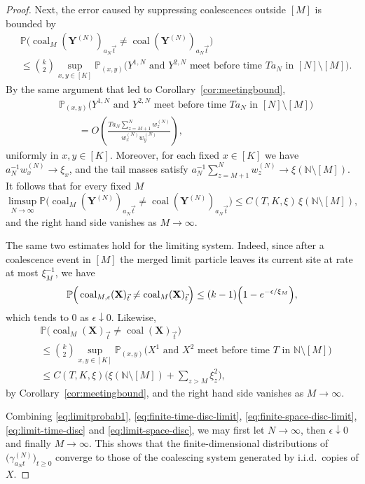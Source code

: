 \documentclass[10pt,a4paper]{amsart}
\newcommand{\bN}{\ensuremath{\mathbb{N}}}
\newcommand{\bP}{\ensuremath{\mathbb{P}}}
\begin{document}
\begin{proof}
	Next, the error caused by suppressing coalescences outside $[M]$ is bounded by
	\begin{align}
		& \bP\big( \operatorname{coal}_{M} (\mathbf{Y}^{(N)})_{a_N\vec{t}}\neq \operatorname{coal}(\mathbf{Y}^{(N)})_{a_N\vec{t}} \big)\nonumber\\
		&\leq \binom{k}{2} \sup_{x,y\in [K]} \bP_{(x,y)}\Big( Y^{1,N}\text{ and } Y^{2,N} \text{ meet before time }Ta_N \text{ in }[N]\setminus[M]\Big). \label{eq:finite-space-disc}
	\end{align}
	By the same argument that led to Corollary~\ref{cor:meetingbound},
	\[
	\begin{aligned}
	&\bP_{(x,y)}\Big( Y^{1,N}\text{ and } Y^{2,N} \text{ meet before time }Ta_N \text{ in }[N]\setminus[M]\Big)\\
	&\qquad =O\left(\frac{T a_N \sum_{z=M+1}^N w^{(N)}_z}{w^{(N)}_x w^{(N)}_y} \right),
	\end{aligned}
	\]
	uniformly in $x,y\in[K]$. Moreover, for each fixed $x\in[K]$ we have
	$a_N^{-1}w_x^{(N)}\to\xi_x$, and the tail masses satisfy
	$a_N^{-1}\sum_{z=M+1}^N w^{(N)}_z\to \xi(\bN\setminus[M])$.
	It follows that for every fixed $M$
	\begin{equation}\label{eq:finite-space-disc-limit}
		\limsup_{N\to\infty}\bP\big( \operatorname{coal}_{M} (\mathbf{Y}^{(N)})_{a_N\vec{t}}\neq \operatorname{coal}(\mathbf{Y}^{(N)})_{a_N\vec{t}} \big)
		\leq C(T,K,\xi)\,\xi(\bN\setminus[M]),
	\end{equation}
	and the right hand side vanishes as $M\to\infty$.

	The same two estimates hold for the limiting system. Indeed, since after a coalescence event in $[M]$ the merged limit particle leaves its current site at rate at most $\xi_M^{-1}$, we have
	\begin{equation}\label{eq:limit-time-disc}
		\bP\Big( \operatorname{coal}_{M,\epsilon}(\mathbf{X})_{\vec{t}}\neq \operatorname{coal}_{M}(\mathbf{X})_{\vec{t}} \Big)
		\leq (k-1)\Big(1-\textup{e}^{-\epsilon/\xi_M}\Big),
	\end{equation}
	which tends to $0$ as $\epsilon\downarrow 0$. Likewise,
	\begin{align}
		& \bP\big( \operatorname{coal}_{M} (\mathbf{X})_{\vec{t}}\neq \operatorname{coal}(\mathbf{X})_{\vec{t}} \big)\nonumber\\
		&\leq \binom{k}{2}\sup_{x,y\in[K]}\bP_{(x,y)}\Big( X^{1}\text{ and } X^{2} \text{ meet before time }T \text{ in }\bN\setminus[M]\Big)\nonumber\\
		&\leq C(T,K,\xi)\Big(\xi(\bN\setminus[M])+\sum_{z>M}\xi_z^2\Big), \label{eq:limit-space-disc}
	\end{align}
	by Corollary~\ref{cor:meetingbound}, and the right hand side vanishes as $M\to\infty$.

	Combining \eqref{eq:limitprobab1}, \eqref{eq:finite-time-disc-limit}, \eqref{eq:finite-space-disc-limit}, \eqref{eq:limit-time-disc} and \eqref{eq:limit-space-disc}, we may first let $N\to\infty$, then $\epsilon\downarrow 0$ and finally $M\to\infty$. This shows that the finite-dimensional distributions of $\big(\gamma_{a_N t}^{(N)}\big)_{t\geq 0}$ converge to those of the coalescing system generated by i.i.d.\ copies of $X$.
\end{proof}
\end{document}
